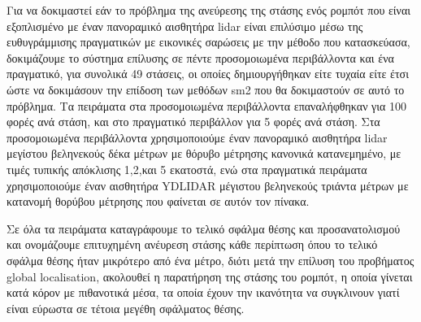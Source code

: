 \documentclass[a4paper,10pt]{article}
\begin{document}
Για να δοκιμαστεί εάν το πρόβλημα της ανεύρεσης της στάσης ενός ρομπότ που
είναι εξοπλισμένο με έναν πανοραμικό αισθητήρα lidar είναι επιλύσιμο μέσω της
ευθυγράμμισης πραγματικών με εικονικές σαρώσεις με την μέθοδο που κατασκεύασα,
δοκιμάζουμε το σύστημα επίλυσης σε πέντε προσομοιωμένα περιβάλλοντα και ένα
πραγματικό, για συνολικά 49 στάσεις, οι οποίες δημιουργήθηκαν είτε τυχαία είτε
έτσι ώστε να δοκιμάσουν την επίδοση των μεθόδων sm2 που θα δοκιμαστούν σε αυτό
το πρόβλημα. Τα πειράματα στα προσομοιωμένα περιβάλλοντα επαναλήφθηκαν για 100
φορές ανά στάση, και στο πραγματικό περιβάλλον για 5 φορές ανά στάση.  Στα
προσομοιωμένα περιβάλλοντα χρησιμοποιούμε έναν πανοραμικό αισθητήρα lidar
μεγίστου βεληνεκούς δέκα μέτρων με θόρυβο μέτρησης κανονικά κατανεμημένο, με
τιμές τυπικής απόκλισης 1,2,και 5 εκατοστά, ενώ στα πραγματικά πειράματα
χρησιμοποιούμε έναν αισθητήρα YDLIDAR μέγιστου βεληνεκούς τριάντα μέτρων με
κατανομή θορύβου μέτρησης που φαίνεται σε αυτόν τον πίνακα.

Σε όλα τα πειράματα καταγράφουμε το τελικό σφάλμα θέσης και προσανατολισμού και
ονομάζουμε επιτυχημένη ανέυρεση στάσης κάθε περίπτωση όπου το τελικό σφάλμα
θέσης ήταν μικρότερο από ένα μέτρο, διότι μετά την επίλυση του προβήματος
global localisation, ακολουθεί η παρατήρηση της στάσης του ρομπότ, η οποία
γίνεται κατά κόρον με πιθανοτικά μέσα, τα οποία έχουν την ικανότητα να
συγκλινουν γιατί είναι εύρωστα σε τέτοια μεγέθη σφάλματος θέσης.
\end{document}
